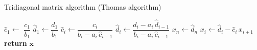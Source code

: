 \documentclass[border=10pt]{article}
\begin{document}
\begin{algorithm}\caption{Tridiagonal matrix algorithm (Thomas algorithm)}\label{TDMA}
  \setlength{\lineskip}{7pt}
  \begin{algorithmic}[1]
      \State $\hat c_1 \gets$ $ \dfrac{c_1}{b_1}$
      \State $\hat d_1 \gets \dfrac{d_1}{b_1}$
        \State $\hat c_i \gets \dfrac{c_i}{b_i-a_i \, \hat c_{i-1}}$
        \State $\hat d_i \gets \dfrac{d_i - a_i \, \hat d_{i-1}}{b_i-a_i \, \hat c_{i-1}}$
      \EndFor
      \State $x_n \gets \hat d_n$
        \State $x_i \gets \hat d_i - \hat c_i \, x_{i+1}$
      \EndFor
      \State \textbf{return} $\textbf{x}$
    \EndFunction
  \end{algorithmic}
\end{algorithm}
\end{document}
